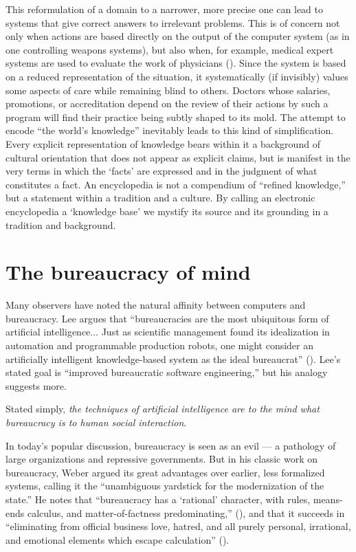 \documentclass[12pt]{article}
\begin{document}
This reformulation of a domain to a narrower, more precise one can lead to systems that give correct answers to irrelevant problems. This is of concern not only when actions are based directly on the output of the computer system (as in one controlling weapons systems), but also when, for example, medical expert systems are used to evaluate the work of physicians (\cite{athanasiou1987}). Since the system is based on a reduced representation of the situation, it systematically (if invisibly) values some aspects of care while remaining blind to others.  Doctors whose salaries,
promotions, or accreditation depend on the review of their actions by
such a program will find their practice being subtly shaped to its mold. The attempt to encode ``the world's knowledge'' inevitably leads to this kind of simplification. Every explicit representation of knowledge bears within it a background of cultural orientation that does not appear as explicit claims, but is manifest in the very terms in which the `facts' are expressed and in the judgment of what constitutes a fact. An encyclopedia is not a compendium of ``refined knowledge,'' but a statement within a tradition and a culture. By calling an electronic encyclopedia a `knowledge base' we mystify its source and its grounding in a tradition and background.

\section{The bureaucracy of mind}

Many observers have noted the natural affinity between computers and bureaucracy. Lee argues that ``bureaucracies are the most ubiquitous form of artificial intelligence... Just as scientific management found its idealization in automation and programmable production robots, one might consider an artificially intelligent knowledge-based system as the ideal bureaucrat'' (\cite{lee1985}). Lee's stated goal is ``improved bureaucratic software engineering,'' but his analogy suggests more.

Stated simply, {\it the techniques of artificial intelligence are to the mind what bureaucracy is to human social interaction}.

In today's popular discussion, bureaucracy is seen as an evil --- a pathology of large organizations and repressive governments. But in his classic work on bureaucracy, Weber argued its great advantages over earlier, less formalized systems, calling it the ``unambiguous yardstick for the modernization of the state.'' He notes that ``bureaucracy has a `rational' character, with rules, means-ends calculus, and matter-of-factness predominating,'' (\cite{weber1968}), and that it succeeds in ``eliminating from official business love, hatred, and all purely personal, irrational, and emotional elements which escape calculation'' (\cite{weber1968}).
\end{document}
